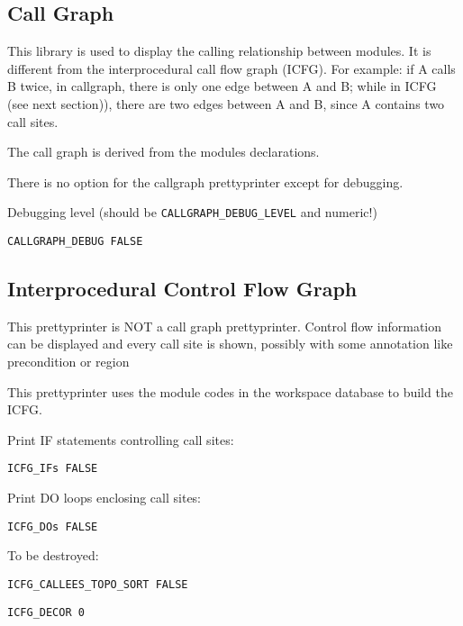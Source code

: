 \subsection{Call Graph}

This library is used to display the calling relationship between
modules.  It is different from the interprocedural call flow graph
(ICFG). For  example: if A calls B twice, in
callgraph, there is only one edge between A and B; while in ICFG (see
next section)), there are two edges between A and B, since A contains
two call sites.  

The call graph is derived from the modules declarations.

There is no option for the callgraph prettyprinter except
for debugging.

Debugging level (should be \verb+CALLGRAPH_DEBUG_LEVEL+ and numeric!)

\begin{verbatim}
CALLGRAPH_DEBUG FALSE
\end{verbatim}

\subsection{Interprocedural Control Flow Graph}

This prettyprinter is NOT a call graph prettyprinter. Control flow
information can be displayed and every call site is shown, possibly with
some annotation like precondition or region

This prettyprinter uses the module codes in the workspace database to
build the ICFG.

Print IF statements controlling call sites:

\begin{verbatim}
ICFG_IFs FALSE
\end{verbatim}

Print DO loops enclosing call sites:

\begin{verbatim}
ICFG_DOs FALSE
\end{verbatim}

To be destroyed:

\begin{verbatim}
ICFG_CALLEES_TOPO_SORT FALSE
\end{verbatim}

\begin{verbatim}
ICFG_DECOR 0
\end{verbatim}

